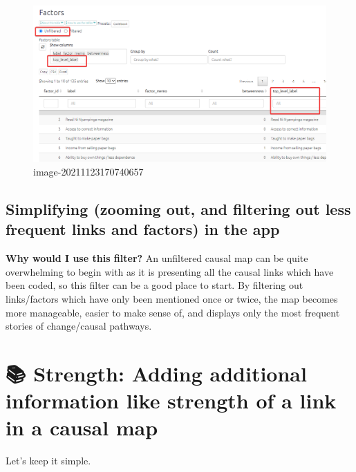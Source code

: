 \documentclass[
]{book}
\begin{document}
\begin{figure}
\centering
\includegraphics{_assets/image-20211123170740657.png}
\caption{image-20211123170740657}
\end{figure}

\hypertarget{simplifying-zooming-out-and-filtering-out-less-frequent-links-and-factors-in-the-app}{%
\section{Simplifying (zooming out, and filtering out less frequent links and factors) in the app}\label{simplifying-zooming-out-and-filtering-out-less-frequent-links-and-factors-in-the-app}}

\textbf{Why would I use this filter?}
An unfiltered causal map can be quite overwhelming to begin with as it is presenting all the causal links which have been coded, so this filter can be a good place to start. By filtering out links/factors which have only been mentioned once or twice, the map becomes more manageable, easier to make sense of, and displays only the most frequent stories of change/causal pathways.

\hypertarget{strength-adding-additional-information-like-strength-of-a-link-in-a-causal-map}{%
\chapter{📚 Strength: Adding additional information like strength of a link in a causal map}\label{strength-adding-additional-information-like-strength-of-a-link-in-a-causal-map}}

Let's keep it simple.
\end{document}
